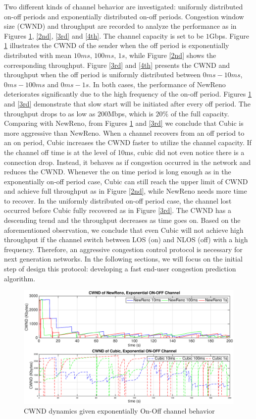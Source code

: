 Two different kinds of channel behavior are investigated: uniformly distributed on-off periods and exponentially distributed on-off periods. Congestion window size (CWND) and throughput are recorded to analyze the performance as in Figures \ref{1st}, \ref{2nd}, \ref{3rd} and \ref{4th}.  The channel capacity is set to be $1$Gbps. Figure \ref{1st} illustrates the CWND of the sender when the off period is exponentially distributed with mean $10ms$, $100ms$, $1s$, while Figure \ref{2nd} shows the corresponding throughput. Figure \ref{3rd} and \ref{4th} presents the CWND and throughput when the off period is uniformly distributed between $0ms - 10ms$, $0ms - 100ms$ and $0ms - 1s$. In both cases, the performance of NewReno deteriorates significantly due to the high frequency of the on-off period. Figures \ref{1st} and \ref{3rd} demonstrate that slow start will be initiated after every off period. The throughput drops to as low as $200$Mbps, which is $20\%$ of the full capacity. Comparing with NewReno, from Figures \ref{1st} and \ref{3rd} we conclude that Cubic is more aggressive than NewReno. When a channel recovers from an off period to an on period, Cubic increases the CWND faster to utilize the channel capacity.  If the channel off time is at the level of 10ms, cubic did not even notice there is a connection drop. Instead, it behaves as if congestion occurred in the network and reduces the CWND. Whenever the on time period is long enough as in the exponentially on-off period case, Cubic can still reach the upper limit of CWND and achieve full throughput as in Figure \ref{2nd}, while NewReno needs more time to recover. In the uniformly distributed on-off period case, the channel lost occurred before Cubic fully recovered as in Figure \ref{3rd}. The CWND has a descending trend and the throughput decreases as time goes on. Based on the aforementioned observation, we conclude that even Cubic will not achieve high throughput if the channel switch between LOS (on) and NLOS (off) with a high frequency. Therefore, an aggressive congestion control protocol is necessary for next generation networks. In the following sections, we will focus on the initial step of design this protocol: developing a fast end-user congestion prediction algorithm.
\begin{figure}
\centering
\includegraphics[width=14cm]{1.eps}
\caption{CWND dynamics given exponentially On-Off channel behavior}
\label{1st}
\end{figure}
